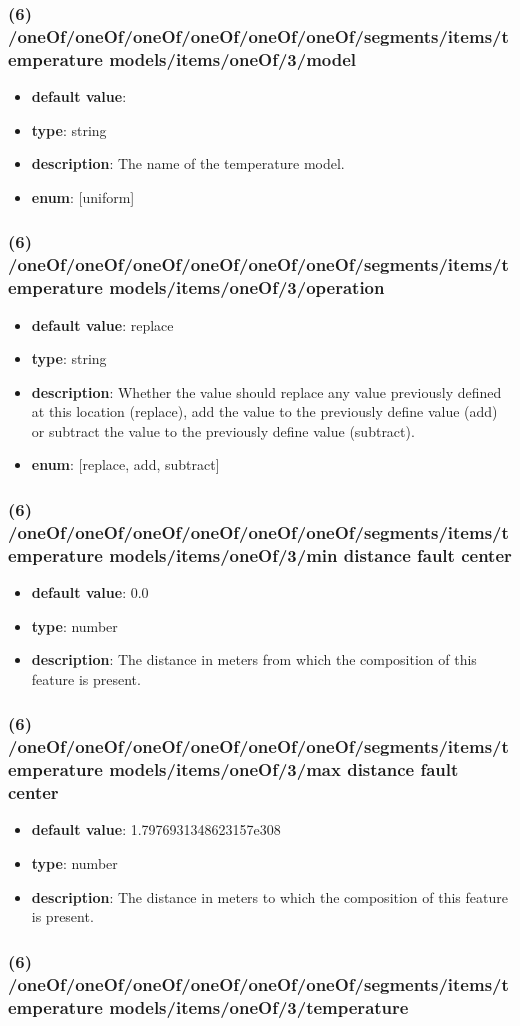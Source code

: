 \subsubsection{(6) /oneOf/oneOf/oneOf/oneOf/oneOf/oneOf/segments/items/temperature models/items/oneOf/3/model}
\begin{itemize}[leftmargin=6em]\item {\bf default value}: 
\item {\bf type}: string
\item {\bf description}: The name of the temperature model.
\item {\bf enum}: [uniform]\end{itemize}\subsubsection{(6) /oneOf/oneOf/oneOf/oneOf/oneOf/oneOf/segments/items/temperature models/items/oneOf/3/operation}
\begin{itemize}[leftmargin=6em]\item {\bf default value}: replace
\item {\bf type}: string
\item {\bf description}: Whether the value should replace any value previously defined at this location (replace), add the value to the previously define value (add) or subtract the value to the previously define value (subtract).
\item {\bf enum}: [replace, add, subtract]\end{itemize}\subsubsection{(6) /oneOf/oneOf/oneOf/oneOf/oneOf/oneOf/segments/items/temperature models/items/oneOf/3/min distance fault center}
\begin{itemize}[leftmargin=6em]\item {\bf default value}: 0.0
\item {\bf type}: number
\item {\bf description}: The distance in meters from which the composition of this feature is present.
\end{itemize}\subsubsection{(6) /oneOf/oneOf/oneOf/oneOf/oneOf/oneOf/segments/items/temperature models/items/oneOf/3/max distance fault center}
\begin{itemize}[leftmargin=6em]\item {\bf default value}: 1.7976931348623157e308
\item {\bf type}: number
\item {\bf description}: The distance in meters to which the composition of this feature is present.
\end{itemize}\subsubsection{(6) /oneOf/oneOf/oneOf/oneOf/oneOf/oneOf/segments/items/temperature models/items/oneOf/3/temperature}
